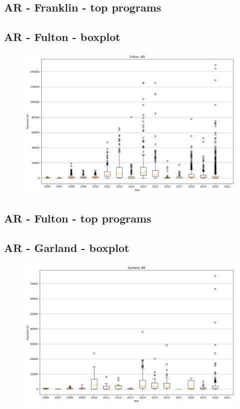 \subsection*{AR - Franklin - top programs}

\newpage
\subsection*{AR - Fulton - boxplot}
\begin{figure}[h]
\centering
\includegraphics[width=7in]{../output/boxplots/counties/Fulton-AR_boxplot.png}
\end{figure}


\subsection*{AR - Fulton - top programs}

\newpage
\subsection*{AR - Garland - boxplot}
\begin{figure}[h]
\centering
\includegraphics[width=7in]{../output/boxplots/counties/Garland-AR_boxplot.png}
\end{figure}


